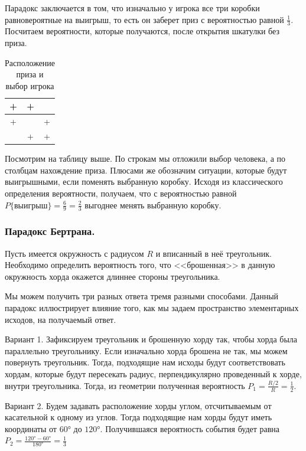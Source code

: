\noindent Парадокс заключается в том, что изначально у игрока все три коробки равновероятные на выигрыш, то есть он заберет приз с вероятностью равной $\frac{1}{3}$. Посчитаем вероятности, которые получаются, после открытия шкатулки без приза. 

\begin{table}[h]
    \centering
    \begin{tabular}{|c|c|c|}
    \hline
    + & + &   \\ 
    \hline
    + &   & + \\ 
    \hline
      & + & + \\ 
    \hline
    \end{tabular}
    \caption{Расположение приза и выбор игрока}
\end{table}

\noindent Посмотрим на таблицу выше. По строкам мы отложили выбор человека, а по столбцам нахождение приза. Плюсами же обозначим ситуации, которые будут выигрышными, если поменять выбранную коробку. Исходя из классического определения вероятности, получаем, что с вероятностью равной $P\{\text{выигрыш}\} = \frac{6}{9} = \frac{2}{3}$ выгоднее менять выбранную коробку. 

\subsubsection{Парадокс Бертрана.}

\begin{problem}
    Пусть имеется окружность с радиусом $R$ и вписанный в неё треугольник. Необходимо определить вероятность того, что <<брошенная>> в данную окружность хорда окажется длиннее стороны треугольника. 
\end{problem}

\noindent Мы можем получить три разных ответа тремя разными способами. Данный парадокс иллюстрирует влияние того, как мы задаем пространство элементарных исходов, на получаемый ответ. 

\noindent Вариант 1. Зафиксируем треугольник и брошенную хорду так, чтобы хорда была параллельно треугольнику. Если изначально хорда брошена не так, мы можем повернуть треугольник. Тогда, подходящие нам исходы будут соответствовать хордам, которые будут пересекать радиус, перпендикулярно проведенный к хорде, внутри треугольника. Тогда, из геометрии полученная вероятность $P_1 = \frac{R/2}{R} = \frac{1}{2}$.

\noindent Вариант 2. Будем задавать расположение хорды углом, отсчитываемым от касательной к одному из углов. Тогда подходящие нам хорды будут иметь координаты от $\ang{60}$ до $\ang{120}$. Получившаяся вероятность события будет равна $P_2 = \frac{\ang{120} - \ang{60}}{\ang{180}} = \frac{1}{3}$

